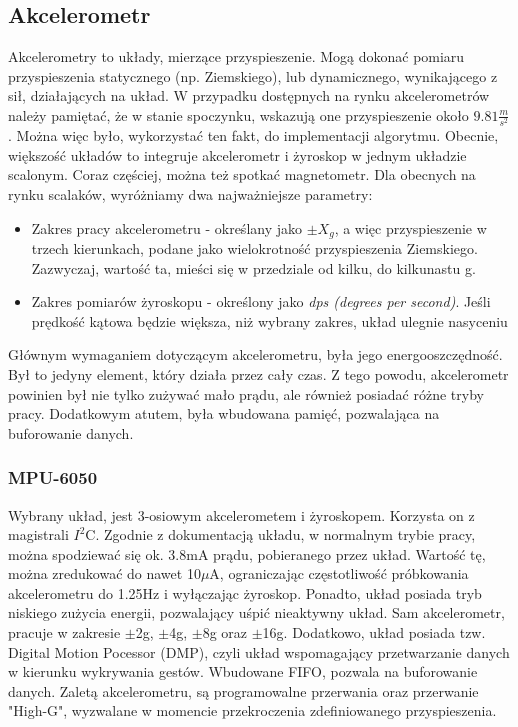 \subsection{Akcelerometr}
Akcelerometry to układy, mierzące przyspieszenie. Mogą dokonać pomiaru przyspieszenia statycznego (np. Ziemskiego), lub dynamicznego, wynikającego z sił, działających na układ. W przypadku dostępnych na rynku akcelerometrów należy pamiętać, że w stanie spoczynku, wskazują one przyspieszenie około $9.81\frac{m}{s^{2}}$. Można więc było, wykorzystać ten fakt, do implementacji algorytmu.
\newline
Obecnie, większość układów to integruje akcelerometr i żyroskop w jednym układzie scalonym. Coraz częściej, można też spotkać magnetometr. Dla obecnych na rynku scalaków, wyróżniamy dwa najważniejsze parametry:
\begin{itemize}
    \item Zakres pracy akcelerometru - określany jako $\pm X_{g}$, a więc przyspieszenie w trzech kierunkach, podane jako wielokrotność przyspieszenia Ziemskiego. Zazwyczaj, wartość ta, mieści się w przedziale od kilku, do kilkunastu g.
    \item Zakres pomiarów żyroskopu - określony jako \emph{dps (degrees per second)}. Jeśli prędkość kątowa będzie większa, niż wybrany zakres, układ ulegnie nasyceniu
\end{itemize}
Głównym wymaganiem dotyczącym akcelerometru, była jego energooszczędność. Był to jedyny element, który działa przez cały czas. Z tego powodu, akcelerometr powinien był nie tylko zużywać mało prądu, ale również posiadać różne tryby pracy. Dodatkowym atutem, była wbudowana pamięć, pozwalająca na buforowanie danych.

\subsubsection{MPU-6050}
Wybrany układ, jest 3-osiowym akcelerometem i żyroskopem. Korzysta on z magistrali $I^{2}$C. Zgodnie z dokumentacją układu, w normalnym trybie pracy, można spodziewać się ok. 3.8mA prądu, pobieranego przez układ.\cite{MPU6050} Wartość tę, można zredukować do nawet 10$\mu$A, ograniczając częstotliwość próbkowania akcelerometru do 1.25Hz i wyłączając żyroskop. Ponadto, układ posiada tryb niskiego zużycia energii, pozwalający uśpić nieaktywny układ. Sam akcelerometr, pracuje w zakresie $\pm$2g, $\pm$4g, $\pm$8g oraz $\pm$16g. Dodatkowo, układ posiada tzw. Digital Motion Pocessor (DMP), czyli układ wspomagający przetwarzanie danych w kierunku wykrywania gestów. Wbudowane FIFO, pozwala na buforowanie danych. Zaletą akcelerometru, są programowalne przerwania oraz przerwanie "High-G", wyzwalane w momencie przekroczenia zdefiniowanego przyspieszenia.


